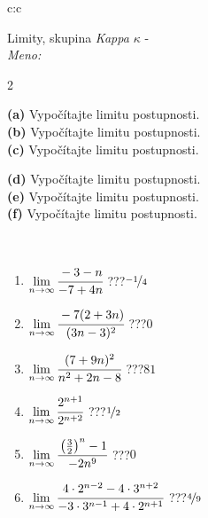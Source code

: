 \documentclass[10pt]{report}
\begin{document}
\newpage
\thispagestyle{empty}
\begin{tabular}{c:c}
\begin{minipage}[c][104.5mm][t]{0.5\linewidth}
\begin{center}
\vspace{5mm}
{\huge Limity, skupina \textit{Kappa $\kappa$} -}\\[5mm]
\textit{Meno:}\phantom{xxxxxxxxxxxxxxxxxxxxxxxxxxxxxxxxxxxxxxxxxxxxxxxxxxxxxxxxxxxxxxxxx}\\[5mm]
\begin{minipage}{0.95\linewidth}
\begin{center}
{\small \begin{multicols}{2} \raggedright
\textbf{(a)} Vypočítajte limitu postupnosti. \\[1mm]
\textbf{(b)} Vypočítajte limitu postupnosti. \\[1mm]
\textbf{(c)} Vypočítajte limitu postupnosti. \par \columnbreak
\textbf{(d)} Vypočítajte limitu postupnosti. \\[1mm]
\textbf{(e)} Vypočítajte limitu postupnosti. \\[1mm]
\textbf{(f)} Vypočítajte limitu postupnosti.
\end{multicols}
}
\end{center}
\end{minipage}
\\[1mm]
\begin{minipage}{0.79\linewidth}
\begin{center}
\begin{varwidth}{\linewidth}
\setlength{\itemsep}{0pt}
\begin{enumerate}
\footnotesizerr
\item $\lim\limits_{n\to\infty}\cfrac{-3-n}{-7+4n}$\quad \dotfill\; ???\;\dotfill \quad $\nicefrac{-1}{4}$
\item $\lim\limits_{n\to\infty}\cfrac{-7(2+3n)}{(3n-3)^2}$\quad \dotfill\; ???\;\dotfill \quad $0$
\item $\lim\limits_{n\to\infty}\cfrac{(7+9n)^2}{n^2+2n-8}$\quad \dotfill\; ???\;\dotfill \quad $81$
\item $\lim\limits_{n\to\infty}\cfrac{2^{n+1}}{2^{n+2}}$\quad \dotfill\; ???\;\dotfill \quad $\nicefrac{1}{2}$
\item $\lim\limits_{n\to\infty}\cfrac{\left(\frac{3}{2}\right)^n -1}{-2n^{9}}$\quad \dotfill\; ???\;\dotfill \quad $0$
\item $\lim\limits_{n\to\infty}\cfrac{4\cdot 2^{n-2}-4\cdot 3^{n+2}}{-3\cdot 3^{n-1}+4\cdot 2^{n+1}}$\quad \dotfill\; ???\;\dotfill \quad $\nicefrac{4}{9}$

\end{enumerate}
\end{varwidth}
\end{center}
\end{minipage}
\end{center}
\end{minipage}
\end{tabular}
\end{document}
